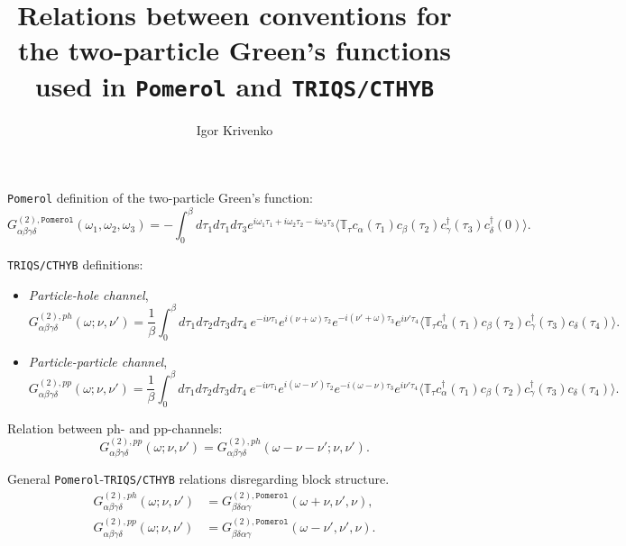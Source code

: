\documentclass[a4paper,12pt]{article}
\newcommand{\aver}[1]{\ensuremath{\langle#1\rangle}}
\renewcommand{\t}{\ensuremath{\tau}}
\newcommand{\w}{\ensuremath{\omega}}
\newcommand{\n}{\ensuremath{\nu}}
\newcommand{\TT}{\ensuremath{\mathbb{T}_\t}}
\newcommand{\pom}{\ensuremath{\mathtt{Pomerol}}}
\begin{document}
\title{Relations between conventions for the two-particle Green's functions
       used in \texttt{Pomerol} and \texttt{TRIQS/CTHYB}}
\author{Igor Krivenko}
\maketitle

\texttt{Pomerol} definition of the two-particle Green's function:
\begin{equation}\label{g2_pomerol}
	G^{(2),\pom}_{\alpha\beta\gamma\delta}(\w_1,\w_2,\w_3) =
	- \int_0^\beta d\t_1d\t_1d\t_3
		e^{i\w_1\t_1 + i\w_2\t_2 - i\w_3\t_3}
		\aver{\TT
		c_\alpha(\t_1)c_\beta(\t_2)c^\dag_\gamma(\t_3)c^\dag_\delta(0)}.
\end{equation}

\texttt{TRIQS/CTHYB} definitions:
\begin{itemize}
	\item \textit{Particle-hole channel},
		\begin{equation}\label{g2_ph}
			G^{(2),ph}_{\alpha\beta\gamma\delta}(\w;\n,\n') =
			\frac{1}{\beta}\int_0^\beta d\t_1d\t_2d\t_3d\t_4\
			e^{-i\n\t_1} e^{i(\n+\w)\tau_2} e^{-i(\n'+\w)\t_3} e^{i\n'\t_4}
			\aver{\TT
			c^\dag_\alpha(\t_1) c_\beta(\t_2) c^\dag_\gamma(\t_3)
			c_\delta(\t_4)}.
	\end{equation}

	\item \textit{Particle-particle channel},
		\begin{equation}\label{g2_pp}
			G^{(2),pp}_{\alpha\beta\gamma\delta}(\w;\n,\n') =
			\frac{1}{\beta}\int_0^\beta d\t_1d\t_2d\t_3d\t_4\
			e^{-i\n\t_1} e^{i(\w-\n')\t_2} e^{-i(\w-\n)\t_3} e^{i\n'\t_4}
			\aver{\TT
			c^\dag_\alpha(\t_1) c_\beta(\t_2) c^\dag_\gamma(\t_3)
			c_\delta(\t_4)}.
		\end{equation}
\end{itemize}

Relation between ph- and pp-channels:
\begin{equation}
	G^{(2),pp}_{\alpha\beta\gamma\delta}(\w;\n,\n') =
	G^{(2),ph}_{\alpha\beta\gamma\delta}(\w-\n-\n';\n,\n').
\end{equation}

General \texttt{Pomerol}-\texttt{TRIQS/CTHYB} relations disregarding block
structure.
\begin{align}
	G^{(2),ph}_{\alpha\beta\gamma\delta}(\w;\n,\n') &=
	G^{(2),\pom}_{\beta\delta\alpha\gamma}(\w+\n,\n',\n),\\
	G^{(2),pp}_{\alpha\beta\gamma\delta}(\w;\n,\n') &=
	G^{(2),\pom}_{\beta\delta\alpha\gamma}(\w-\n',\n',\n).
\end{align}
\end{document}
